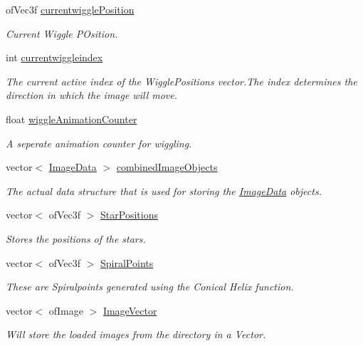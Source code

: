 \begin{DoxyCompactItemize}
of\-Vec3f \hyperlink{group___wiggle_gaf81358868ae15faab1974ec074b1509f}{currentwiggle\-Position}
\begin{DoxyCompactList}\small\item\em Current Wiggle P\-Osition. \end{DoxyCompactList}\item 
int \hyperlink{group___wiggle_ga6b9af0b1ae4a2c0530eb6a8cf8340751}{currentwiggleindex}
\begin{DoxyCompactList}\small\item\em The current active index of the Wiggle\-Positions vector.\-The index determines the direction in which the image will move. \end{DoxyCompactList}\item 
float \hyperlink{group___wiggle_ga6073b33be7847d675ec089a1d514c506}{wiggle\-Animation\-Counter}
\begin{DoxyCompactList}\small\item\em A seperate animation counter for wiggling. \end{DoxyCompactList}\item 
vector$<$ \hyperlink{struct_image_data}{Image\-Data} $>$ \hyperlink{classtest_app_aced9b8a8419c8465877c2c9cd43f8934}{combined\-Image\-Objects}
\begin{DoxyCompactList}\small\item\em The actual data structure that is used for storing the \hyperlink{struct_image_data}{Image\-Data} objects. \end{DoxyCompactList}\item 
vector$<$ of\-Vec3f $>$ \hyperlink{classtest_app_a68d0d30cea64a9d39a1b2deef16677ad}{Star\-Positions}
\begin{DoxyCompactList}\small\item\em Stores the positions of the stars. \end{DoxyCompactList}\item 
vector$<$ of\-Vec3f $>$ \hyperlink{classtest_app_af0dd2f3e3aabdb43bee49d74c156dc05}{Spiral\-Points}
\begin{DoxyCompactList}\small\item\em These are Spiralpoints generated using the Conical Helix function. \end{DoxyCompactList}\item 
vector$<$ of\-Image $>$ \hyperlink{classtest_app_ad4de5d6e6e8f3b8bb7424e62792deb1f}{Image\-Vector}
\begin{DoxyCompactList}\small\item\em Will store the loaded images from the directory in a Vector. \end{DoxyCompactList}\item 

\end{DoxyCompactItemize}
